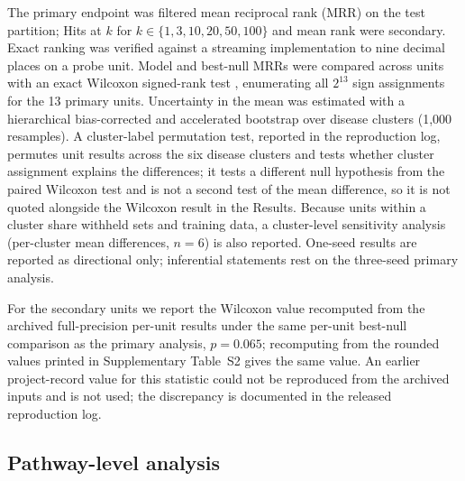 \documentclass[11pt]{article}
\begin{document}
The primary endpoint was filtered mean reciprocal rank (MRR) on the test partition; Hits at $k$ for $k \in \{1, 3, 10, 20, 50, 100\}$ and mean rank were secondary. Exact ranking was verified against a streaming implementation to nine decimal places on a probe unit. Model and best-null MRRs were compared across units with an exact Wilcoxon signed-rank test \cite{wilcoxon1945}, enumerating all $2^{13}$ sign assignments for the 13 primary units. Uncertainty in the mean was estimated with a hierarchical bias-corrected and accelerated bootstrap \cite{efron1987} over disease clusters (1,000 resamples). A cluster-label permutation test, reported in the reproduction log, permutes unit results across the six disease clusters and tests whether cluster assignment explains the differences; it tests a different null hypothesis from the paired Wilcoxon test and is not a second test of the mean difference, so it is not quoted alongside the Wilcoxon result in the Results. Because units within a cluster share withheld sets and training data, a cluster-level sensitivity analysis (per-cluster mean differences, $n = 6$) is also reported. One-seed results are reported as directional only; inferential statements rest on the three-seed primary analysis.

For the secondary units we report the Wilcoxon value recomputed from the archived full-precision per-unit results under the same per-unit best-null comparison as the primary analysis, $p = 0.065$; recomputing from the rounded values printed in Supplementary Table~S2 gives the same value. An earlier project-record value for this statistic could not be reproduced from the archived inputs and is not used; the discrepancy is documented in the released reproduction log.

\subsection{Pathway-level analysis}
\end{document}
